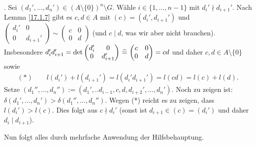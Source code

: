 \documentclass[../../main.tex]{subfiles}
\begin{document}
\begin{cproof}
\begin{behbox}
        \hbeg{}. Sei $(d_1',\ldots ,d_n')\in (A\setminus\{0\})^n\setminus G$. Wähle $i\in\{1,\ldots ,n-1\}$ mit $d_i'\nmid d_{i+1}'$. Nach Lemma \ref{17.1.7} gibt es $c,d\in A$ mit $(c)=(d_i',d_{i+1}')$ und $\begin{pmatrix*}d_i'&0\\ 0&d_{i+1}'\end{pmatrix*}\sim\begin{pmatrix*}c&0\\ 0&d\end{pmatrix*}$ (und $c\mid d$, was wir aber nicht brauchen). Insbesondere $d_i'd_{i+1}'=\det\begin{pmatrix*}d_i'&0\\ 0&d_{i+1}'\end{pmatrix*}\divi\begin{pmatrix*}c&0\\ 0&d\end{pmatrix*}=cd$ und daher $c,d\in A\setminus\{0\}$ sowie
        \begin{align*}
            (*)\qquad l(d_i')+l(d_{i+1}')=l(d_i'd_{i+1}')=l(cd)=l(c)+l(d).
        \end{align*}
        Setze $(d_1'',\ldots ,d_n''):=(d_1',..d_{i-1},c,d,d_{i+2}',\ldots ,d_n')$. Noch zu zeigen ist: $\delta(d_1',\ldots ,d_n')>\delta(d_1'',\ldots ,d_n'')$. Wegen (*) reicht es zu zeigen, dass $l(d_i')>l(c)$. Dies folgt aus $c\nmid d_i'$ (sonst ist $d_{i+1}\in (c)=(d_i')$ und daher $d_i\mid d_{i+1}$).
    \end{behbox}

    \noindent Nun folgt alles durch mehrfache Anwendung der Hilfsbehauptung.
\end{cproof}
\end{document}
